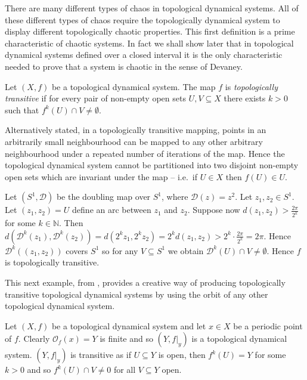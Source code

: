 There are many different types of chaos in topological dynamical systems. All of these different types of chaos require the topologically dynamical system to display different topologically chaotic properties.
This first definition is a prime characteristic of chaotic systems. In fact we shall show later that in topological dynamical systems defined over a closed interval it is the only characteristic needed to prove that a system is chaotic in the sense of Devaney.

\begin{defn} \label{defn:topological-transitivity}
    Let $(X, f)$ be a topological dynamical system. The map $f$ is \emph{topologically transitive} if for every pair of non-empty open sets $U, V \subseteq X$ there exists $k > 0$ such that $f^k(U) \cap V \neq \emptyset$.
\end{defn}

Alternatively stated, in a topologically transitive mapping, points in an arbitrarily small neighbourhood can be mapped to any other arbitrary neighbourhood under a repeated number of iterations of the map. Hence the topological dynamical system cannot be partitioned into two disjoint non-empty open sets which are invariant under the map -- i.e.\ if $U \in X$ then $f(U) \in U$.

\begin{exmp}
    Let $(S^1, \mathcal{D})$ be the doubling map over $S^1$, where $\mathcal{D}(z) = z^2$. Let $z_1, z_2 \in S^1$. Let $(z_1, z_2) = U$ define an arc between $z_1$ and $z_2$. Suppose now $d\left(z_1, z_2\right) > \frac{2\pi}{2^k}$ for some $k \in \mathbb{N}$. Then $d\left(\mathcal{D}^k(z_1), \mathcal{D}^k(z_2)\right) = d\left( 2^k z_1, 2^k z_2 \right) = 2^k d\left( z_1, z_2 \right) > 2^k \cdot \frac{2\pi}{2^k} = 2\pi$. Hence $\mathcal{D}^k((z_1, z_2))$ covers $S^1$ so for any $V \subseteq S^1$ we obtain $\mathcal{D}^k(U) \cap V \neq \emptyset$. Hence $f$ is topologically transitive.
\end{exmp}

This next example, from \cite{kolyada-snoha}, provides a creative way of producing topologically transitive topological dynamical systems by using the orbit of any other topological dynamical system.

\begin{exmp}
    Let $(X, f)$ be a topological dynamical system and let $x \in X$ be a periodic point of $f$. Clearly $\mathcal{O}_f(x) = Y$ is finite and so $(Y, f|_y)$ is a topological dynamical system. $(Y, f|_y)$ is transitive as if $U \subseteq Y$ is open, then $f^k(U) = Y$ for some $k > 0$ and so $f^k(U) \cap V \neq 0$ for all $V \subseteq Y$ open.
\end{exmp}

